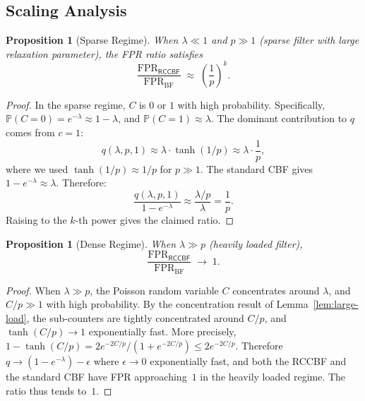 \documentclass[11pt,a4paper]{article}
\newtheorem{proposition}[theorem]{Proposition}
\newcommand{\RCCBF}{\textsf{RCCBF}}
\newcommand{\FPR}{\mathrm{FPR}}
\newcommand{\Prob}{\mathbb{P}}
\begin{document}
\subsection{Scaling Analysis}\label{ssec:fpr-scaling}

\begin{proposition}[Sparse Regime]\label{prop:sparse}
When $\lambda \ll 1$ and $p \gg 1$ (sparse filter with large relaxation
parameter), the FPR ratio satisfies
\begin{equation}\label{eq:sparse-ratio}
  \frac{\FPR_{\RCCBF}}{\FPR_{\mathrm{BF}}}
  \;\approx\; \left(\frac{1}{p}\right)^k.
\end{equation}
\end{proposition}

\begin{proof}
In the sparse regime, $C$ is $0$ or $1$ with high probability.
Specifically, $\Prob(C = 0) = e^{-\lambda} \approx 1 - \lambda$, and
$\Prob(C = 1) \approx \lambda$.  The dominant contribution to $q$ comes
from $c = 1$:
\begin{equation}\label{eq:q-sparse}
  q(\lambda, p, 1)
  \approx \lambda \cdot \tanh(1/p)
  \approx \lambda \cdot \frac{1}{p},
\end{equation}
where we used $\tanh(1/p) \approx 1/p$ for $p \gg 1$.
The standard CBF gives $1 - e^{-\lambda} \approx \lambda$.  Therefore:
\begin{equation}\label{eq:ratio-sparse}
  \frac{q(\lambda, p, 1)}{1 - e^{-\lambda}}
  \approx \frac{\lambda/p}{\lambda} = \frac{1}{p}.
\end{equation}
Raising to the $k$-th power gives the claimed ratio.
\end{proof}

\begin{proposition}[Dense Regime]\label{prop:dense}
When $\lambda \gg p$ (heavily loaded filter),
\begin{equation}\label{eq:dense-ratio}
  \frac{\FPR_{\RCCBF}}{\FPR_{\mathrm{BF}}} \;\to\; 1.
\end{equation}
\end{proposition}

\begin{proof}
When $\lambda \gg p$, the Poisson random variable $C$ concentrates around
$\lambda$, and $C/p \gg 1$ with high probability.  By the concentration
result of Lemma~\ref{lem:large-load}, the sub-counters are tightly
concentrated around $C/p$, and $\tanh(C/p) \to 1$ exponentially fast.
More precisely, $1 - \tanh(C/p) = 2e^{-2C/p}/(1 + e^{-2C/p}) \le
2e^{-2C/p}$.  Therefore $q \to (1 - e^{-\lambda}) - \epsilon$ where $\epsilon \to 0$
exponentially fast, and both the \RCCBF{} and the standard
CBF have FPR approaching~$1$ in the heavily loaded regime.  The ratio
thus tends to~$1$.
\end{proof}
\end{document}
